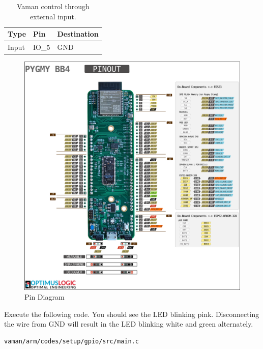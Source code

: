 \documentclass[journal,12pt,twocolumn]{IEEEtran}
\renewcommand\thesection{\arabic{section}}
\renewcommand\thesubsection{\thesection.\arabic{subsection}}
\begin{document}
\begin{enumerate}[label=\thesubsection.\arabic*.,ref=\thesubsection.\theenumi]
\begin{table}[]
\centering
\begin{tabular}{|l|l|l|}
\hline
Type & Pin  &  Destination\\ \hline
Input &  IO\_5 &  GND\\ \hline
\end{tabular}
\caption{Vaman control through external input.}
\label{tab:vaman/arm/setup/input}
\end{table}

\begin{figure}[!ht]
\centering
\includegraphics[width = \textwidth]{vaman/arm/setup/figs/pin_sheet.png}
\caption{Pin Diagram}
\label{fig:vaman/arm/setup/pin_sheet}
\end{figure}
\solution Execute the following code.  You should see the LED blinking pink. Disconnecting the wire from GND will result in the LED blinking white 
and green alternately.
\begin{lstlisting}
vaman/arm/codes/setup/gpio/src/main.c
\end{lstlisting}

\end{enumerate}
\end{document}
